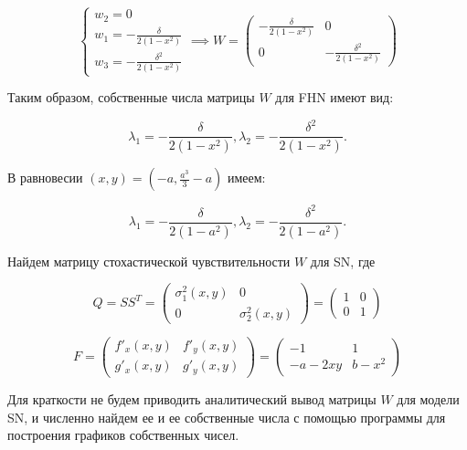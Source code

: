 $$
\begin{cases}
    w_2 = 0 \\
    w_1 = -\frac{\delta}{2(1 - x^2)} \\
    w_3 = -\frac{\delta^2}{2(1 - x^2)}
\end{cases}
\implies
W =
\begin{pmatrix}
    -\frac{\delta}{2(1 - x^2)} & 0 \\
    0 & -\frac{\delta^2}{2(1 - x^2)}
\end{pmatrix}
$$

Таким образом, собственные числа матрицы $W$ для FHN имеют вид:

$$
\lambda_1 = -\frac{\delta}{2(1 - x^2)}, \lambda_2 = -\frac{\delta^2}{2(1 - x^2)}.
$$

В равновесии $(x, y) = (-a, \frac{a^3}{3} - a)$ имеем:

$$
\lambda_1 = -\frac{\delta}{2(1 - a^2)}, \lambda_2 = -\frac{\delta^2}{2(1 - a^2)}.
$$

Найдем матрицу стохастической чувствительности $W$ для SN, где

$$
Q = SS^T = 
\begin{pmatrix}
    \sigma_1^2(x, y) & 0 \\
    0 & \sigma_2^2(x, y)
\end{pmatrix}
=
\begin{pmatrix}
    1 & 0 \\
    0 & 1
\end{pmatrix}
$$

$$
F = 
\begin{pmatrix}
    f'_x(x, y) & f'_y(x, y) \\
    g'_x(x, y) & g'_y(x, y)
\end{pmatrix}
=
\begin{pmatrix}
    -1 & 1 \\
    -a - 2xy & b - x^2
\end{pmatrix}
$$

Для краткости не будем приводить аналитический вывод матрицы $W$ для модели SN, и численно найдем ее и ее собственные числа с помощью программы для построения графиков собственных чисел.


